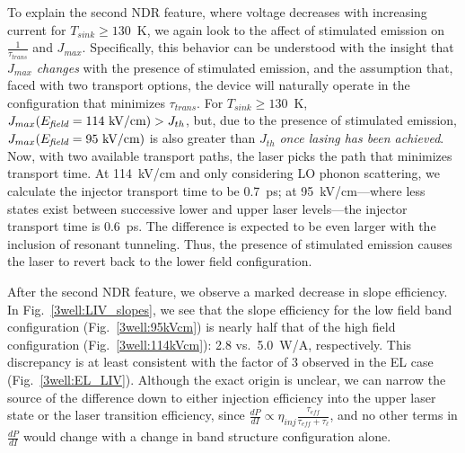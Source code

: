 To explain the second NDR feature, where voltage decreases with increasing current for $T_\textit{sink}\geq130$~K, we again look to the affect of stimulated emission on $\frac{1}{\tau_\textit{trans}}$ and $J_{max}$.  Specifically, this behavior can be understood with the insight that $J_{max}$ \emph{changes} with the presence of stimulated emission, and the assumption that, faced with two transport options, the device will naturally operate in the configuration that minimizes $\tau_\textit{trans}$.  For $T_\textit{sink}\geq130$~K, $J_{max}(E_\textit{field}=114~\textnormal{kV/cm})>J_{th}$, but, due to the presence of stimulated emission, $J_{max}(E_\textit{field}=95~\textnormal{kV/cm})$ is also greater than $J_{th}$ \emph{once lasing has been achieved}.  Now, with two available transport paths, the laser picks the path that minimizes transport time.  %
At 114~kV/cm and only considering LO phonon scattering, we calculate the injector transport time to be 0.7~ps; at 95~kV/cm---where less states exist between successive lower and upper laser levels---the injector transport time is 0.6~ps.  The difference is expected to be even larger with the inclusion of resonant tunneling.  Thus, the presence of stimulated emission causes the laser to revert back to the lower field configuration.%


After the second NDR feature, we observe a marked decrease in slope efficiency.  In Fig.~\ref{3well:LIV_slopes}, we see that the slope efficiency for the low field band configuration (Fig.~\ref{3well:95kVcm}) is nearly half that of the high field configuration (Fig.~\ref{3well:114kVcm}): 2.8 vs.\ 5.0~W/A, respectively.  This discrepancy is at least consistent with the factor of 3 observed in the EL case (Fig.~\ref{3well:EL_LIV}).  Although the exact origin is unclear, we can narrow the source of the difference down to either injection efficiency into the upper laser state or the laser transition efficiency, since $\frac{d P}{dI}\propto \eta_\textit{inj} \frac{\tau_\textit{eff}}{\tau_\textit{eff}+\tau_{\ell}}$, and no other terms in $\frac{d P}{dI}$ would change with a change in band structure configuration alone.


